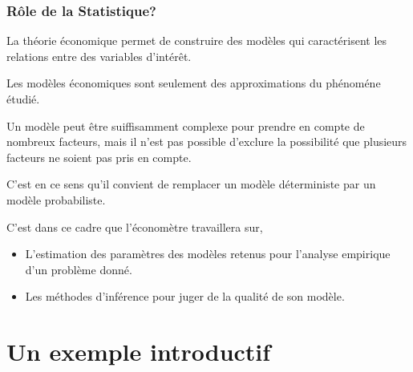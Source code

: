 \begin{frame}[allowframebreaks]\frametitle{Rôle de la Statistique?}

  La théorie économique permet de construire des modèles qui
  caractérisent les relations entre des variables d'intérêt.

\medskip

  Les modèles économiques sont seulement des approximations du phénoméne étudié.
  
\medskip

Un modèle peut être suiffisamment complexe pour prendre en
    compte de nombreux facteurs, mais  il n'est pas possible d'exclure
    la possibilité que plusieurs facteurs ne soient pas pris en
    compte.

\medskip

C'est en ce sens qu'il convient de remplacer un modèle déterministe par un modèle probabiliste.
 

\framebreak

C'est dans ce cadre que l'économètre travaillera sur,

\begin{itemize}

\item L'estimation  des paramètres des modèles retenus pour
  l'analyse empirique d'un problème donné.
\item Les méthodes d'inférence pour juger de la qualité de son modèle.

\end{itemize}

\end{frame}

\section{Un exemple introductif}
\frame{\sectionpage}



